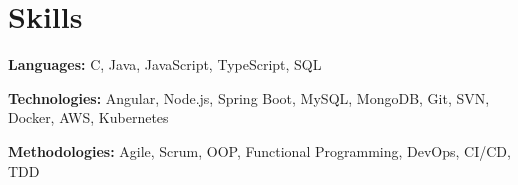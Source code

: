 \documentclass{resume}
\begin{document}

\section{Skills}
  \vspace{2pt}
  \resumeSubHeadingListStart
    \small{\item{
        
        \textbf{Languages:}{ C, Java, JavaScript, TypeScript, SQL} \\ \vspace{3pt}
        
        \textbf{Technologies:}{ Angular, Node.js, Spring Boot, MySQL, MongoDB, Git, SVN, Docker, AWS, Kubernetes} \\ \vspace{3pt}
        
        \textbf{Methodologies:}{ Agile, Scrum, OOP, Functional Programming, DevOps, CI/CD, TDD} \\ \vspace{3pt}
        
    }}
  \resumeSubHeadingListEnd


\end{document}
